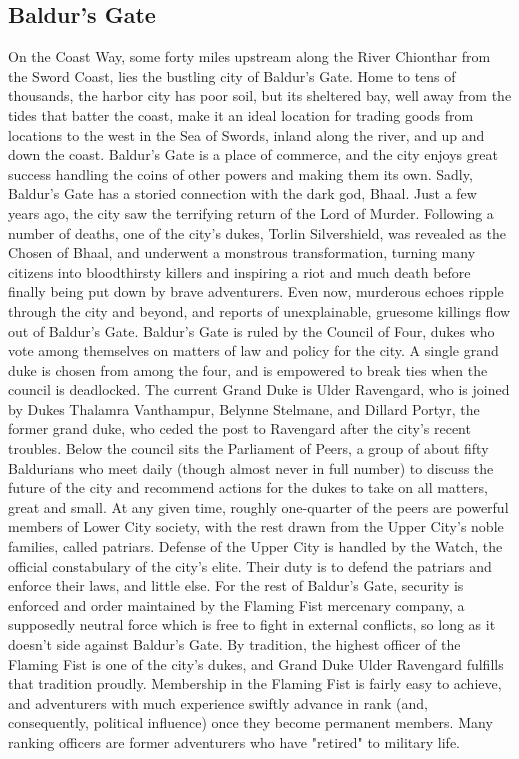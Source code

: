 \documentclass[10pt,a4paper,twoside,twocolumn,openany,bg=print,nodeprecatedcode]{dndbook}
\begin{document}
\subsection{Baldur's Gate}
On the Coast Way, some forty miles upstream along the River Chionthar from the Sword Coast, lies the bustling city of Baldur's Gate. Home to tens of thousands, the harbor city has poor soil, but its sheltered bay, well away from the tides that batter the coast, make it an ideal location for trading goods from locations to the west in the Sea of Swords, inland along the river, and up and down the coast. Baldur's Gate is a place of commerce, and the city enjoys great success handling the coins of other powers and making them its own.
Sadly, Baldur's Gate has a storied connection with the dark god, Bhaal. Just a few years ago, the city saw the terrifying return of the Lord of Murder. Following a number of deaths, one of the city's dukes, Torlin Silvershield, was revealed as the Chosen of Bhaal, and underwent a monstrous transformation, turning many citizens into bloodthirsty killers and inspiring a riot and much death before finally being put down by brave adventurers. Even now, murderous echoes ripple through the city and beyond, and reports of unexplainable, gruesome killings flow out of Baldur's Gate.
Baldur's Gate is ruled by the Council of Four, dukes who vote among themselves on matters of law and policy for the city. A single grand duke is chosen from among the four, and is empowered to break ties when the council is deadlocked. The current Grand Duke is Ulder Ravengard, who is joined by Dukes Thalamra Vanthampur, Belynne Stelmane, and Dillard Portyr, the former grand duke, who ceded the post to Ravengard after the city's recent troubles. Below the council sits the Parliament of Peers, a group of about fifty Baldurians who meet daily (though almost never in full number) to discuss the future of the city and recommend actions for the dukes to take on all matters, great and small. At any given time, roughly one-quarter of the peers are powerful members of Lower City society, with the rest drawn from the Upper City's noble families, called patriars.
Defense of the Upper City is handled by the Watch, the official constabulary of the city's elite. Their duty is to defend the patriars and enforce their laws, and little else. For the rest of Baldur's Gate, security is enforced and order maintained by the Flaming Fist mercenary company, a supposedly neutral force which is free to fight in external conflicts, so long as it doesn't side against Baldur's Gate. By tradition, the highest officer of the Flaming Fist is one of the city's dukes, and Grand Duke Ulder Ravengard fulfills that tradition proudly. Membership in the Flaming Fist is fairly easy to achieve, and adventurers with much experience swiftly advance in rank (and, consequently, political influence) once they become permanent members. Many ranking officers are former adventurers who have "retired" to military life.
\end{document}
